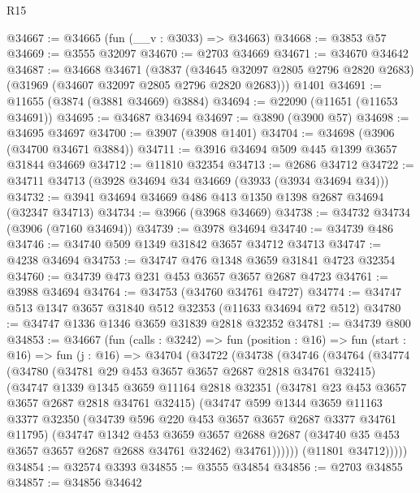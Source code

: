 \begin{lexlean}{R15}
\begin{coremodule}
@34667 := @34665 (fun (__v : @3033) => @34663)
@34668 := @3853 @57
@34669 := @3555 @32097
@34670 := @2703 @34669
@34671 := @34670 @34642
@34687 := @34668
    @34671
    (@3837 (@34645 @32097 @2805 @2796 @2820 @2683) (@31969 (@34607 @32097 @2805 @2796 @2820 @2683)))
    @1401
@34691 := @11655 (@3874 (@3881 @34669) @3884)
@34694 := @22090 (@11651 (@11653 @34691))
@34695 := @34687 @34694
@34697 := @3890 (@3900 @57)
@34698 := @34695 @34697
@34700 := @3907 (@3908 @1401)
@34704 := @34698 (@3906 (@34700 @34671 @3884))
@34711 := @3916 @34694 @509 @445 @1399 @3657 @31844 @34669
@34712 := @11810 @32354
@34713 := @2686 @34712
@34722 := @34711 @34713 (@3928 @34694 @34 @34669 (@3933 (@3934 @34694 @34)))
@34732 := @3941 @34694 @34669 @486 @413 @1350 @1398 @2687 @34694 (@32347 @34713)
@34734 := @3966 (@3968 @34669)
@34738 := @34732 @34734 (@3906 (@7160 @34694))
@34739 := @3978 @34694
@34740 := @34739 @486
@34746 := @34740 @509 @1349 @31842 @3657 @34712 @34713
@34747 := @4238 @34694
@34753 := @34747 @476 @1348 @3659 @31841 @4723 @32354
@34760 := @34739 @473 @231 @453 @3657 @3657 @2687 @4723
@34761 := @3988 @34694
@34764 := @34753 (@34760 @34761 @4727)
@34774 := @34747 @513 @1347 @3657 @31840 @512 @32353 (@11633 @34694 @72 @512)
@34780 := @34747 @1336 @1346 @3659 @31839 @2818 @32352
@34781 := @34739 @800
@34853 := @34667
    (fun (calls : @3242) =>
    fun (position : @16) =>
    fun (start : @16) =>
    fun (j : @16) =>
    @34704
      (@34722
        (@34738
          (@34746
            (@34764
              (@34774
                (@34780
                  (@34781 @29 @453 @3657 @3657 @2687 @2818 @34761 @32415)
                  (@34747
                    @1339
                    @1345
                    @3659
                    @11164
                    @2818
                    @32351
                    (@34781 @23 @453 @3657 @3657 @2687 @2818 @34761 @32415)
                    (@34747
                      @599
                      @1344
                      @3659
                      @11163
                      @3377
                      @32350
                      (@34739 @596 @220 @453 @3657 @3657 @2687 @3377 @34761 @11795)
                      (@34747
                        @1342
                        @453
                        @3659
                        @3657
                        @2688
                        @2687
                        (@34740 @35 @453 @3657 @3657 @2687 @2688 @34761 @32462)
                        @34761))))))
            (@11801 @34712)))))
@34854 := @32574 @3393
@34855 := @3555 @34854
@34856 := @2703 @34855
@34857 := @34856 @34642

\end{coremodule}
\end{lexlean}
